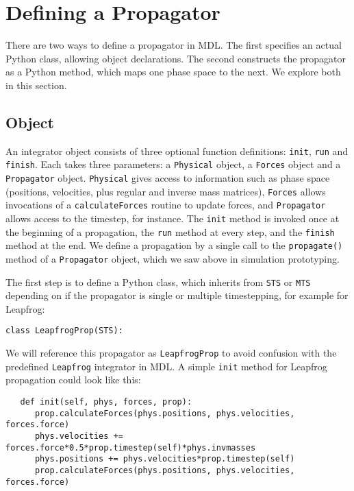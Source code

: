 \documentclass[11pt]{report}
\begin{document}
\chapter{Defining a Propagator}

There are two ways to define a propagator in MDL.
The first specifies an actual Python class, allowing object
declarations.  The second constructs the propagator as a Python
method, which maps one phase space to the next.  We explore
both in this section.


\section{Object}

An integrator object consists of three optional function definitions:
\texttt{init}, \texttt{run} and \texttt{finish}.  Each takes three
parameters: a \texttt{Physical} object, a \texttt{Forces} object and
a \texttt{Propagator} object.  \texttt{Physical} gives access to 
information such as phase space (positions, velocities, plus regular
and inverse mass matrices), \texttt{Forces} allows invocations of
a \texttt{calculateForces} routine to update forces, and \texttt{Propagator}
allows access to the timestep, for instance.  The \texttt{init}
method is invoked once at the beginning of a propagation, the \texttt{run}
method at every step, and the \texttt{finish} method at the end.
We define a propagation by a single call to the \texttt{propagate()}
method of a \texttt{Propagator} object, which we saw above
in simulation prototyping.

The first step is to define a Python class, which inherits from
\texttt{STS} or \texttt{MTS} depending on if the propagator is single
or multiple timestepping, for example for Leapfrog:

\begin{verbatim}
class LeapfrogProp(STS):
\end{verbatim}

We will reference this propagator as \texttt{LeapfrogProp} to avoid
confusion with the predefined \texttt{Leapfrog} integrator in MDL.
A simple \texttt{init} method for Leapfrog propagation could look like this:

\begin{verbatim}
   def init(self, phys, forces, prop):
      prop.calculateForces(phys.positions, phys.velocities, forces.force)
      phys.velocities += forces.force*0.5*prop.timestep(self)*phys.invmasses
      phys.positions += phys.velocities*prop.timestep(self)
      prop.calculateForces(phys.positions, phys.velocities, forces.force)
\end{verbatim}
\end{document}
